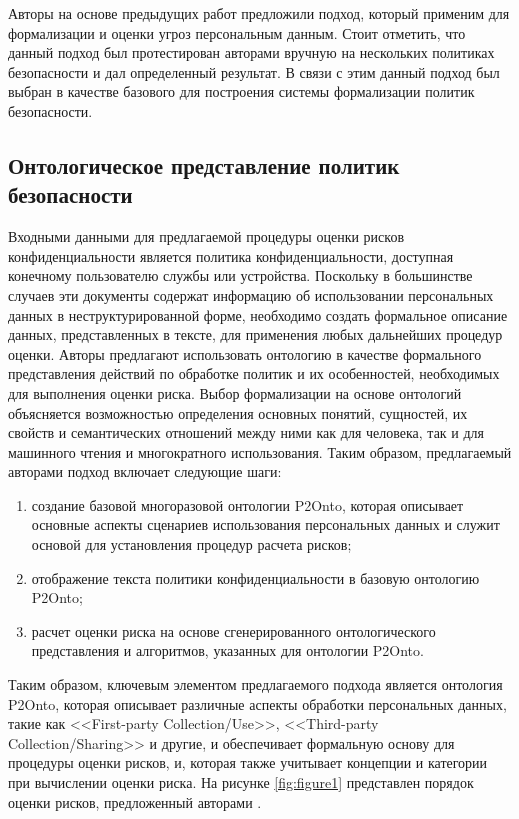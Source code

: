 \documentclass[../main]{subfiles}
\begin{document}
Авторы \cite{P2Onto} на основе предыдущих работ предложили подход, который применим для формализации и оценки угроз персональным данным. Стоит отметить, что данный подход был протестирован авторами вручную на нескольких политиках безопасности и дал определенный результат. В связи с этим данный подход был выбран в качестве базового для построения системы формализации политик безопасности.

\subsection{Онтологическое представление политик безопасности}

Входными данными для предлагаемой процедуры оценки рисков конфиденциальности является политика конфиденциальности, доступная конечному пользователю службы или устройства. Поскольку в большинстве случаев эти документы содержат информацию об использовании персональных данных в неструктурированной форме, необходимо создать формальное описание данных, представленных в тексте, для применения любых дальнейших процедур оценки. Авторы \cite{P2Onto} предлагают использовать онтологию в качестве формального представления действий по обработке политик и их особенностей, необходимых для выполнения оценки риска. Выбор формализации на основе онтологий объясняется возможностью определения основных понятий, сущностей, их свойств и семантических отношений между ними как для человека, так и для машинного чтения и многократного использования. Таким образом, предлагаемый авторами подход включает следующие шаги: 
\begin{enumerate}
    \item создание базовой многоразовой онтологии P2Onto, которая описывает основные аспекты сценариев использования персональных данных и служит основой для установления процедур расчета рисков;
    \item отображение текста политики конфиденциальности в базовую онтологию P2Onto;
    \item расчет оценки риска на основе сгенерированного онтологического представления и алгоритмов, указанных для онтологии P2Onto.
\end{enumerate}

Таким образом, ключевым элементом предлагаемого подхода является онтология P2Onto, которая описывает различные аспекты обработки персональных данных, такие как <<First-party Collection/Use>>, <<Third-party Collection/Sharing>> и другие, и обеспечивает формальную основу для процедуры оценки рисков, и, которая также учитывает концепции и категории при вычислении оценки риска. На рисунке \ref{fig:figure1} представлен порядок оценки рисков, предложенный авторами \cite{P2Onto}.
\end{document}
